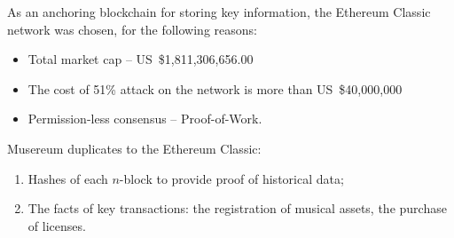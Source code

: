 \documentclass[12pt]{report}
\begin{document}
As an anchoring blockchain for storing key information, the Ethereum Classic network was chosen, for the following reasons:
\begin{itemize}
	\item Total market cap – US~\$1,811,306,656.00
	\item The cost of 51\% attack on the network is more than US~\$40,000,000
	\item Permission-less consensus – Proof-of-Work.
\end{itemize}

Musereum duplicates to the Ethereum Classic:
\begin{enumerate}
	\item Hashes of each $n$-block to provide proof of historical data;
	\item The facts of key transactions: the registration of musical assets, the purchase of licenses.
\end{enumerate}
\end{document}
